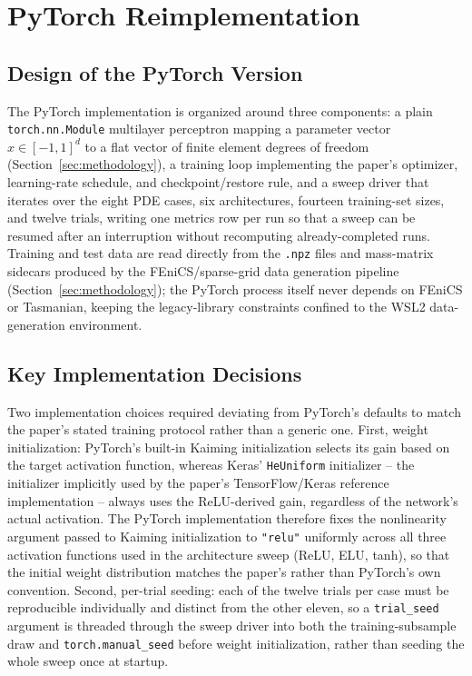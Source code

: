 \cleardoubleoddpage%
\chapter{PyTorch Reimplementation}
\label{sec:pytorchreimplementation}

\section{Design of the PyTorch Version}

The PyTorch implementation \cite{paszke2019pytorch} is organized around
three components: a plain \texttt{torch.nn.Module} multilayer perceptron
mapping a parameter vector
$x \in [-1,1]^d$ to a flat vector of finite element degrees of freedom
(Section~\ref{sec:methodology}), a training loop implementing the paper's
optimizer, learning-rate schedule, and checkpoint/restore rule, and a
sweep driver that iterates over the eight PDE cases, six architectures,
fourteen training-set sizes, and twelve trials, writing one metrics row
per run so that a sweep can be resumed after an interruption without
recomputing already-completed runs. Training and test data are read
directly from the \texttt{.npz} files and mass-matrix sidecars produced by
the FEniCS/sparse-grid data generation pipeline (Section~\ref{sec:methodology});
the PyTorch process itself never depends on FEniCS or Tasmanian, keeping
the legacy-library constraints confined to the WSL2 data-generation
environment.

\section{Key Implementation Decisions}

Two implementation choices required deviating from PyTorch's defaults to
match the paper's stated training protocol rather than a generic one.
First, weight initialization: PyTorch's built-in Kaiming initialization
selects its gain based on the target activation function, whereas Keras'
\texttt{HeUniform} initializer -- the initializer implicitly used by the
paper's TensorFlow/Keras reference implementation -- always uses the
ReLU-derived gain, regardless of the network's actual activation. The
PyTorch implementation therefore fixes the nonlinearity argument passed to
Kaiming initialization to \texttt{"relu"} uniformly across all three
activation functions used in the architecture sweep (ReLU, ELU, tanh), so
that the initial weight distribution matches the paper's rather than
PyTorch's own convention. Second, per-trial seeding: each of the twelve
trials per case must be reproducible individually and distinct from the
other eleven, so a \texttt{trial\_seed} argument is threaded through the
sweep driver into both the training-subsample draw and
\texttt{torch.manual\_seed} before weight initialization, rather than
seeding the whole sweep once at startup.

